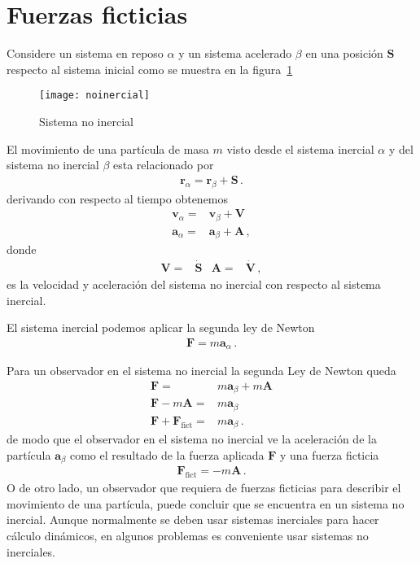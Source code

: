 \section{Fuerzas ficticias}
Considere un sistema en reposo $\alpha$ y un sistema acelerado $\beta$ en una posición $\mathbf{S}$ respecto al sistema inicial como se muestra en la figura~\ref{fig:noinercial}
\begin{figure}
  \centering
  \texttt{[image: noinercial]}
  \caption{Sistema no inercial}
  \label{fig:noinercial}
\end{figure}

El movimiento de una partícula de masa $m$ visto desde el sistema inercial $\alpha$ y del sistema no inercial $\beta$ esta relacionado por
\begin{align*}
  \mathbf{r}_\alpha=\mathbf{r}_\beta+\mathbf{S}\,.
\end{align*}
derivando con respecto al tiempo obtenemos
\begin{align*}
   \mathbf{v}_\alpha=&\mathbf{v}_\beta+\mathbf{V}\nonumber\\
   \mathbf{a}_\alpha=&\mathbf{a}_\beta+\mathbf{A}\,,
\end{align*}
donde
\begin{align*}
  \mathbf{V}=&\dot{\mathbf{S}} &   \mathbf{A}=&\dot{\mathbf{V}}\,,  
\end{align*}
es la velocidad y aceleración del sistema no inercial con respecto al sistema inercial. 

El sistema inercial podemos aplicar la segunda ley de Newton
\begin{align*}
  \mathbf{F}=m \mathbf{a}_\alpha\,.
\end{align*}

Para un observador en el sistema no inercial la segunda Ley de Newton queda
\begin{align*}
  \mathbf{F}=&m \mathbf{a}_\beta+m\mathbf{A}\nonumber\\
  \mathbf{F}-m\mathbf{A}=&m \mathbf{a}_\beta\nonumber\\
  \mathbf{F}+\mathbf{F}_{\text{fict}}=&m \mathbf{a}_\beta\,.
\end{align*}
de modo que el observador en el sistema no inercial ve la aceleración de la partícula $\mathbf{a}_\beta$ como el resultado de la fuerza aplicada $\mathbf{F}$ y una fuerza ficticia
\begin{align*}
  \mathbf{F}_{\text{fict}}=-m\mathbf{A}\,.
\end{align*}
O de otro lado, un observador que requiera de fuerzas ficticias para describir el movimiento de una partícula, puede concluir que se encuentra en un sistema no inercial. Aunque normalmente se deben usar sistemas inerciales para hacer cálculo dinámicos, en algunos problemas es conveniente usar sistemas no inerciales.


